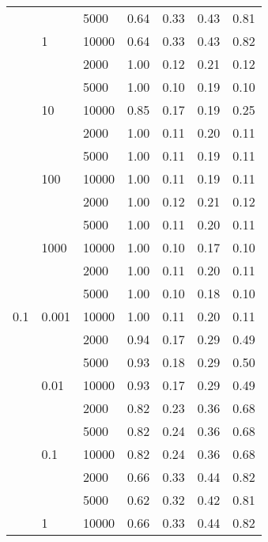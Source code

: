 \begin{tabular}{lllrrrr}
      &       & 5000 &       0.64 &       0.33 &       0.43 &       0.81 \\
      & 1 & 10000 &       0.64 &       0.33 &       0.43 &       0.82 \\
      &       & 2000 &       1.00 &       0.12 &       0.21 &       0.12 \\
      &       & 5000 &       1.00 &       0.10 &       0.19 &       0.10 \\
      & 10 & 10000 &       0.85 &       0.17 &       0.19 &       0.25 \\
      &       & 2000 &       1.00 &       0.11 &       0.20 &       0.11 \\
      &       & 5000 &       1.00 &       0.11 &       0.19 &       0.11 \\
      & 100 & 10000 &       1.00 &       0.11 &       0.19 &       0.11 \\
      &       & 2000 &       1.00 &       0.12 &       0.21 &       0.12 \\
      &       & 5000 &       1.00 &       0.11 &       0.20 &       0.11 \\
      & 1000 & 10000 &       1.00 &       0.10 &       0.17 &       0.10 \\
      &       & 2000 &       1.00 &       0.11 &       0.20 &       0.11 \\
      &       & 5000 &       1.00 &       0.10 &       0.18 &       0.10 \\
0.1 & 0.001 & 10000 &       1.00 &       0.11 &       0.20 &       0.11 \\
      &       & 2000 &       0.94 &       0.17 &       0.29 &       0.49 \\
      &       & 5000 &       0.93 &       0.18 &       0.29 &       0.50 \\
      & 0.01 & 10000 &       0.93 &       0.17 &       0.29 &       0.49 \\
      &       & 2000 &       0.82 &       0.23 &       0.36 &       0.68 \\
      &       & 5000 &       0.82 &       0.24 &       0.36 &       0.68 \\
      & 0.1 & 10000 &       0.82 &       0.24 &       0.36 &       0.68 \\
      &       & 2000 &       0.66 &       0.33 &       0.44 &       0.82 \\
      &       & 5000 &       0.62 &       0.32 &       0.42 &       0.81 \\
      & 1 & 10000 &       0.66 &       0.33 &       0.44 &       0.82 \\

\end{tabular}
